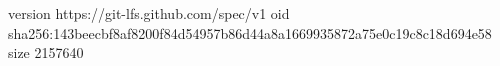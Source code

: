 version https://git-lfs.github.com/spec/v1
oid sha256:143beecbf8af8200f84d54957b86d44a8a1669935872a75e0c19c8c18d694e58
size 2157640
